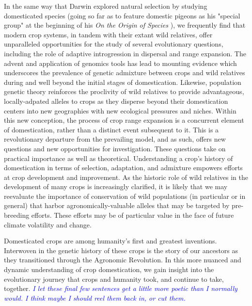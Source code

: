 \documentclass[11pt]{article}
\newcommand{\gmj}[1]{\textcolor{blue}{ \emph{\scriptsize  #1}} } %
\begin{document}
In the same way that Darwin explored natural selection by studying domesticated species (going so far as to feature domestic pigeons as his "special group" at the beginning of his 
\emph{On the Origin of Species} \cite{darwin2009origin}), we frequently find that modern crop systems, in tandem with their extant wild relatives, offer unparalleled opportunities for the study of several evolutionary questions, including the role of adaptive introgression in dispersal and range expansion.
The advent and application of genomics tools has lead to mounting evidence which underscores the prevalence of genetic admixture between crops and wild relatives during and well beyond the initial stages of domestication.
Likewise, population genetic theory reinforces the proclivity of wild relatives to provide advantageous, locally-adpated alleles to crops as they disperse beyond their domestication centers into new geographies with new ecological pressures and niches.
Within this new conception, the process of crop range expansion is a concurrent element of domestication, rather than a distinct event subsequent to it.
This is a revolutionary departure from the prevailing model, and as such, offers new questions and new opportunities for investigation.
These questions take on practical importance as well as theoretical.
Understanding a crop's history of domestication in terms of selection, adaptation, and admixture empowers efforts at crop development and improvement.
As the historic role of wild relatives in the development of many crops is increasingly clarified, it is likely that we may reevaluate the importance of conservation of wild populations (in particular or in general) that harbor agronomically-valuable alleles that may be targeted by pre-breeding efforts.
These efforts may be of particular value in the face of future climate volatility and change.

Domesticated crops are among humanity's first and greatest inventions.
Interwoven in the genetic history of these crops is the story of our ancestors as they transitioned through the Agronomic Revolution.
In this more nuanced and dynamic understanding of crop domestication, we gain insight into the evolutionary journey that crops and humanity took, and continue to take, together.
\gmj{I let these final few sentences get a little more poetic than I normally would.  I think maybe I should reel them back in, or cut them.}
\end{document}
